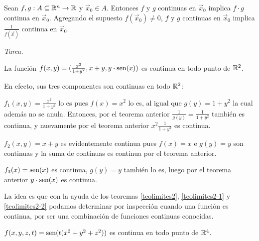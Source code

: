 \begin{teorema}\label{teolimites2-2}
Sean $f,g:A\subseteq\mathbb{R}^n\to\mathbb{R}$ y $\vec{x}_0\in A$. Entonces $f$ y $g$ continuas en $\vec{x}_0$ implica $f\cdot g$ continua en $\vec{x}_0$. Agregando el supuesto $f(\vec{x}_0)\neq 0$, $f$ y $g$ continuas en $\vec{x}_0$ implica $\frac{1}{f(\vec{x})}$ continua en $\vec{x}_0$.
\end{teorema}

\begin{demostracion}
\emph{Tarea.}
\end{demostracion}

\begin{ejemplo} 
La funci\'on $f(x,y)=(\frac{x^2}{1+y^2},x+y,y\cdot \text{sen}(x))$ es 
continua en todo punto de $\mathbb{R}^2$.

\begin{solucion}
En efecto, sus tres componentes son continuas en todo $\mathbb{R}^2$:

$f_1(x,y)=\frac{x^2}{1+y^2}$ lo es pues $f(x)=x^2$ lo es, al igual que 
$g(y)=1+y^2$ la cual adem\'as no se anula. Entonces, por el teorema anterior 
$\frac{1}{g(y)}=\frac{1}{1+y^2}$ tambi\'en es continua, y 
nuevamente por el teorema anterior $x^2\frac{1}{1+y^2}$ es continua.

$f_2(x,y)=x+y$ es evidentemente continua pues $f(x)=x$ e $g(y)=y$ son continuas y la suma de continuas es continua por el teorema anterior.

$f_3(x)=\text{sen}(x)$ es continua, $g(y)=y$ tambi\'en lo es, luego por el teorema anterior $y\cdot \text{sen}(x)$ es continua.

La idea es que con la ayuda de los teoremas \ref{teolimites2}, \ref{teolimites2-1} y \ref{teolimites2-2} podamos determinar por inspecci\'on cuando una funci\'on es continua, por ser una combinaci\'on de funciones continuas conocidas.
\end{solucion}
\end{ejemplo}

\begin{ejemplo} 
$f(x,y,z,t)=\text{sen}(t(x^2+y^2+z^2))$ es continua en todo punto de $\mathbb{R}^4$.
\end{ejemplo}


